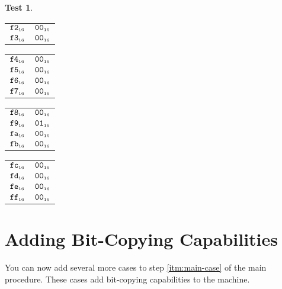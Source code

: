 \documentclass[a4paper,12pt]{article}
\makeatletter
\newcommand{\num}[1]{\texttt{\MakeLowercase{#1}}}
\newcommand{\hex}[1]{\num{#1}_{\textup{\tiny 16}}}
\newcommand{\MEM}[1]{\ifthenelse{\equal{#1}{}}{M}{M[#1]}}
\theoremstyle{definition}
\newtheorem{test}{Test}
\newenvironment{memtable}{%
  \begin{trivlist}
    \item
    }{%
    \end{trivlist}}
\newenvironment{memcolumn}{%
  \begin{tabular}{@{}ll@{}}
    \hline}
    {%
    \hline
  \end{tabular}}
\newcommand{\memspace}{\qquad}
\makeatother
\begin{document}
\begin{test}
\begin{memtable}
\begin{memcolumn}
      $\hex{F2}$ & $\hex{00}$ \\
      $\hex{F3}$ & $\hex{00}$ \\
    \end{memcolumn}
    \memspace
    \begin{memcolumn}
      $\hex{F4}$ & $\hex{00}$ \\
      $\hex{F5}$ & $\hex{00}$ \\
      $\hex{F6}$ & $\hex{00}$ \\
      $\hex{F7}$ & $\hex{00}$ \\
    \end{memcolumn}
    \memspace
    \begin{memcolumn}
      $\hex{F8}$ & $\hex{00}$ \\
      $\hex{F9}$ & $\hex{01}$ \\
      $\hex{FA}$ & $\hex{00}$ \\
      $\hex{FB}$ & $\hex{00}$ \\
    \end{memcolumn}
    \memspace
    \begin{memcolumn}
      $\hex{FC}$ & $\hex{00}$ \\
      $\hex{FD}$ & $\hex{00}$ \\
      $\hex{FE}$ & $\hex{00}$ \\
      $\hex{FF}$ & $\hex{00}$ \\
    \end{memcolumn}
  \end{memtable}
\end{test}

\section{Adding Bit-Copying Capabilities}

You can now add several more cases to step \ref{itm:main-case} of the main procedure.
These cases add bit-copying capabilities to the machine.
\end{document}
